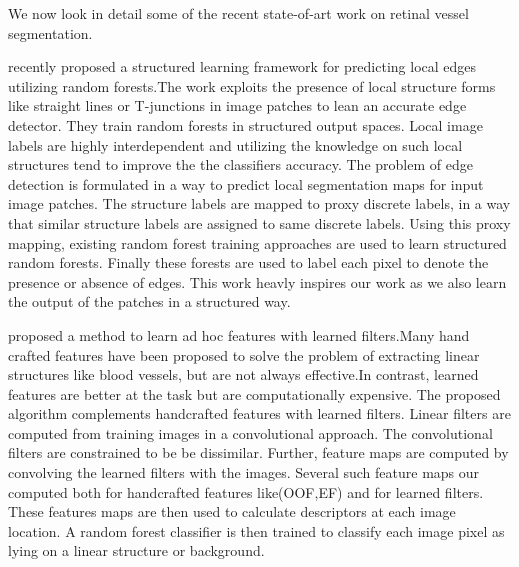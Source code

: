 We now look in detail some of the recent state-of-art work on retinal vessel segmentation.

\citet{dollar2013structured} recently proposed a structured learning framework for predicting local edges utilizing random forests.The work exploits the presence of local structure forms like straight lines or T-junctions in image patches to lean an accurate edge detector. They train random forests in structured output spaces. Local image labels are highly interdependent and utilizing the knowledge on such local structures tend to improve the the classifiers accuracy. The problem of edge detection is formulated in a way to predict local segmentation maps for input image patches.  The structure labels are mapped to proxy discrete labels, in a way that similar structure labels are assigned to same discrete labels. Using this proxy mapping, existing random forest training approaches are used to learn structured random forests. Finally these forests are used to label each pixel to denote the presence or absence of edges. This work heavly inspires our work as we also learn the output of the patches in a structured way.\\
\clearpage

\citet{rigamonti2012accurate} proposed a method to learn ad hoc features with learned filters.Many hand crafted features have been proposed to solve the problem of extracting linear structures like blood vessels, but are not always effective.In contrast, learned features are better at the task but are computationally expensive. The proposed algorithm complements handcrafted features with learned filters. Linear filters are computed from training images in a convolutional approach. The convolutional filters are constrained to be be dissimilar. Further, feature maps are computed by convolving the learned filters with the images. Several such feature maps our computed both for handcrafted features like(OOF,EF) and for learned filters. These features maps are then used to calculate descriptors at each image location. A random forest classifier is then trained to classify each image pixel as lying on a linear structure or background.\\

